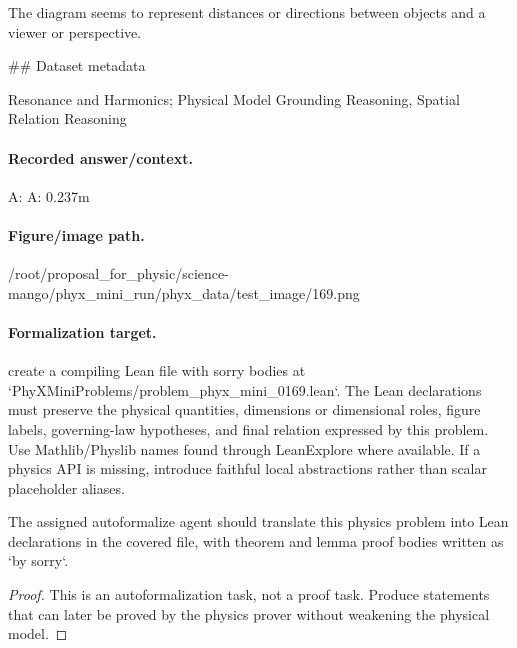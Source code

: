 The diagram seems to represent distances or directions between objects and a viewer or perspective.

\#\# Dataset metadata

Resonance and Harmonics; Physical Model Grounding Reasoning, Spatial Relation Reasoning

\paragraph{Recorded answer/context.}
A: A: 0.237m

\paragraph{Figure/image path.}
/root/proposal\_for\_physic/science-mango/phyx\_mini\_run/phyx\_data/test\_image/169.png

\paragraph{Formalization target.}
create a compiling Lean file with sorry bodies at `PhyXMiniProblems/problem\_phyx\_mini\_0169.lean`. The Lean declarations must preserve the physical quantities, dimensions or dimensional roles, figure labels, governing-law hypotheses, and final relation expressed by this problem.
Use Mathlib/Physlib names found through LeanExplore where available. If a physics API is missing, introduce faithful local abstractions rather than scalar placeholder aliases.

\begin{theorem}
\label{thm:physics:phyx_mini_0169:target}
The assigned autoformalize agent should translate this physics problem into Lean declarations in the covered file, with theorem and lemma proof bodies written as `by sorry`.
\end{theorem}
\begin{proof}
This is an autoformalization task, not a proof task. Produce statements that can later be proved by the physics prover without weakening the physical model.
\end{proof}

